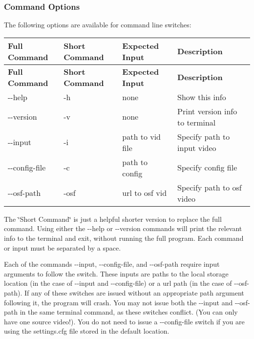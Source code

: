 \subsubsection*{Command Options}

The following options are available for command line switches\+:

\tabulinesep=1mm
\begin{longtabu} spread 0pt [c]{*{4}{|X[-1]}|}
\hline
\rowcolor{\tableheadbgcolor}\textbf{ Full Command }&\textbf{ Short Command }&\textbf{ Expected Input }&\textbf{ Description  }\\
\endfirsthead
\hline
\endfoot
\hline
\rowcolor{\tableheadbgcolor}\textbf{ Full Command }&\textbf{ Short Command }&\textbf{ Expected Input }&\textbf{ Description  }\\
\endhead
{\ttfamily -\/-\/help} &{\ttfamily -\/h} &none &Show this info \\
{\ttfamily -\/-\/version} &{\ttfamily -\/v} &none &Print version info to terminal \\
{\ttfamily -\/-\/input} &{\ttfamily -\/i} &path to vid file&Specify path to input video \\
{\ttfamily -\/-\/config-\/file}&{\ttfamily -\/c} &path to config &Specify config file \\
{\ttfamily -\/-\/osf-\/path} &{\ttfamily -\/osf} &url to osf vid &Specify path to osf video \\
\end{longtabu}
The \char`\"{}\+Short Command\char`\"{} is just a helpful shorter version to replace the full command. Using either the {\ttfamily -\/-\/help} or {\ttfamily -\/-\/version} commands will print the relevant info to the terminal and exit, without running the full program. Each command or input must be separated by a space.

Each of the commands {\ttfamily -\/-\/input}, {\ttfamily -\/-\/config-\/file}, and {\ttfamily -\/-\/osf-\/path} require input arguments to follow the switch. These inputs are paths to the local storage location (in the case of {\ttfamily -\/-\/input} and {\ttfamily -\/-\/config-\/file}) or a url path (in the case of {\ttfamily -\/-\/osf-\/path}). If any of these switches are issued without an appropriate path argument following it, the program will crash. You may not issue both the {\ttfamily -\/-\/input} and {\ttfamily -\/-\/osf-\/path} in the same terminal command, as these switches conflict. (You can only have one source video!). You do not need to issue a {\ttfamily -\/-\/config-\/file} switch if you are using the {\ttfamily settings.\+cfg} file stored in the default location.

